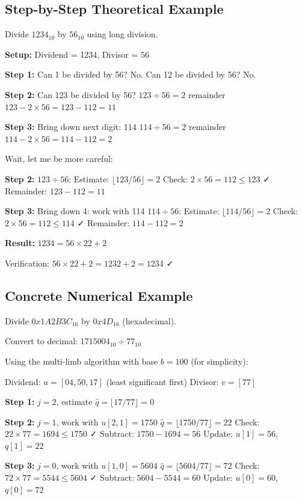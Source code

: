 \documentclass[12pt,a4paper]{article}
\theoremstyle{definition}
\begin{document}
\subsection{Step-by-Step Theoretical Example}

Divide $1234_{10}$ by $56_{10}$ using long division.

\textbf{Setup:} Dividend = 1234, Divisor = 56

\textbf{Step 1:} Can 1 be divided by 56? No. Can 12 be divided by 56? No.

\textbf{Step 2:} Can 123 be divided by 56?
$123 \div 56 = 2$ remainder $123 - 2 \times 56 = 123 - 112 = 11$

\textbf{Step 3:} Bring down next digit: $114$
$114 \div 56 = 2$ remainder $114 - 2 \times 56 = 114 - 112 = 2$

Wait, let me be more careful:

\textbf{Step 2:} $123 \div 56$:
Estimate: $\lfloor 123/56 \rfloor = 2$
Check: $2 \times 56 = 112 \leq 123$ ✓
Remainder: $123 - 112 = 11$

\textbf{Step 3:} Bring down 4: work with 114
$114 \div 56$:
Estimate: $\lfloor 114/56 \rfloor = 2$  
Check: $2 \times 56 = 112 \leq 114$ ✓
Remainder: $114 - 112 = 2$

\textbf{Result:} $1234 = 56 \times 22 + 2$

Verification: $56 \times 22 + 2 = 1232 + 2 = 1234$ ✓

\subsection{Concrete Numerical Example}

Divide $0x1A2B3C_{16}$ by $0x4D_{16}$ (hexadecimal).

Convert to decimal: $1715004_{10} \div 77_{10}$

Using the multi-limb algorithm with base $b = 100$ (for simplicity):

Dividend: $u = [04, 50, 17]$ (least significant first)
Divisor: $v = [77]$

\textbf{Step 1:} $j = 2$, estimate $\hat{q} = \lfloor 17/77 \rfloor = 0$

\textbf{Step 2:} $j = 1$, work with $u[2,1] = 1750$
$\hat{q} = \lfloor 1750/77 \rfloor = 22$
Check: $22 \times 77 = 1694 \leq 1750$ ✓
Subtract: $1750 - 1694 = 56$
Update: $u[1] = 56$, $q[1] = 22$

\textbf{Step 3:} $j = 0$, work with $u[1,0] = 5604$
$\hat{q} = \lfloor 5604/77 \rfloor = 72$
Check: $72 \times 77 = 5544 \leq 5604$ ✓  
Subtract: $5604 - 5544 = 60$
Update: $u[0] = 60$, $q[0] = 72$
\end{document}
